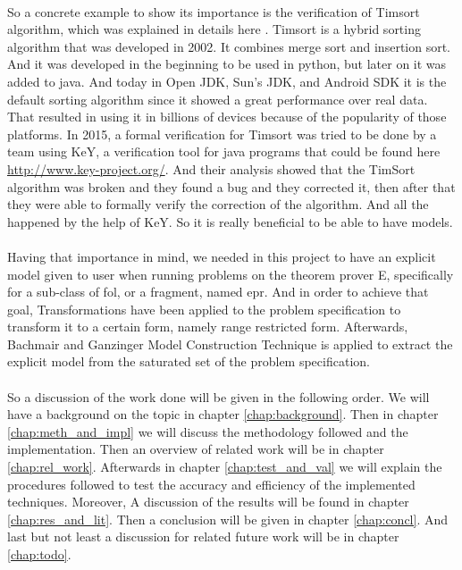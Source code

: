 	\paragraph{}
	So a concrete example to show its importance is the verification of Timsort algorithm, which was explained in details here \cite{TIMSORT}. Timsort is a hybrid sorting algorithm that was developed in 2002. It combines merge sort and insertion sort. And it was developed in the beginning to be used in python, but later on it was added to java. And today in Open JDK, Sun's JDK, and Android SDK it is the default sorting algorithm since it showed a great performance over real data. That resulted in using it in billions of devices because of the popularity of those platforms. In 2015, a formal verification for Timsort was tried to be done by a team using KeY, a verification tool for java programs that could be found here \url{http://www.key-project.org/}. And their analysis showed that the TimSort algorithm was broken and they found a bug and they corrected it, then after that they were able to formally verify the correction of the algorithm. And all the happened by the help of KeY. So it is really beneficial to be able to have models.

	\paragraph{}
	Having that importance in mind, we needed in this project to have an explicit model given to user when running problems on the theorem prover E, specifically for a sub-class of \ac{fol}, or a fragment, named \ac{epr}. And in order to achieve that goal, Transformations have been applied to the problem specification to transform it to a certain form, namely range restricted form. Afterwards, Bachmair and Ganzinger Model Construction Technique is applied to extract the explicit model from the saturated set of the problem specification. 


	\paragraph{}
	So a discussion of the work done will be given in the following order. We will have a background on the topic in chapter \ref{chap:background}. Then in chapter \ref{chap:meth_and_impl} we will discuss the methodology followed and the implementation. Then an overview of related work will be in chapter \ref{chap:rel_work}. Afterwards in chapter \ref{chap:test_and_val} we will explain the procedures followed to test the accuracy and efficiency of the implemented techniques. Moreover, A discussion of the results will be found in chapter \ref{chap:res_and_lit}. Then a conclusion will be given in chapter \ref{chap:concl}. And last but not least a discussion for related future work will be in chapter \ref{chap:todo}. 
